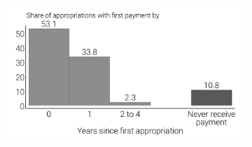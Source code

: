 \documentclass[12pt]{article}
\begin{document}
\begin{figure}[!ht]
    \caption[Appropriation to payment]{Time from appropriation to payment}
    \centering
    \begin{subfigure}{.7\textwidth}
        \centering
        \includegraphics[width=\linewidth]{../analysis/output/appendix/figure_e1_share_rec_pay_by_years_since_app.pdf}
    \end{subfigure}
    \label{fig:appropriation-to-payment}
\end{figure}
\restoregeometry
\end{document}
